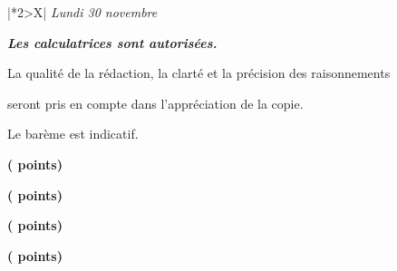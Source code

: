 \documentclass[12pt,french]{book}
\begin{document}
\begin{tabularx}{\linewidth}{|*{2}{>\centering X|}}  %
    \hline
        \textbf{ } \tabularnewline %
        \textit{Lundi 30 novembre} \tabularnewline
    \hline
\end{tabularx}



\begin{spacing}{1.2} %


\begin{center} %
\itshape %
\textbf{Les calculatrices sont autorisées.}\par
La qualité de la rédaction, la clarté et la précision des raisonnements\par
seront pris en compte dans l'appréciation de la copie.\par
Le barème est indicatif.
\end{center}

\exercice \hfill \textbf{( points)}

\medskip

\exercice \hfill \textbf{( points)}

\medskip

\exercice \hfill \textbf{( points)}

\medskip

\exercice \hfill \textbf{( points)}

\medskip



\end{spacing}
\end{document}
